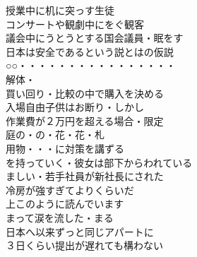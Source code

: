 \begin{multicols}{2}
授業中に机に突っす生徒\\
コンサートや観劇中にをぐ観客\\
議会中にうとうとする国会議員・眠をす\\
日本は安全であるという説とはの仮説\\

○○・・・・・・・・・・・・・・・・\\

解体・\\
買い回り・比較の中で購入を決める\\
入場自由子供はお断り・しかし\\
作業費が２万円を超える場合・限定\\

庭の・の・花・花・札\\
用物・・・に対策を講ずる\\
を持っていく・彼女は部下からわれている\\
ましい・若手社員が新社長にされた\\
冷房が強すぎてよりくらいだ\\

上このように読んでいます\\
まって涙を流した・まる\\
日本へ以来ずっと同じアパートに\\
３日くらい提出が遅れても構わない\\


\end{multicols}
